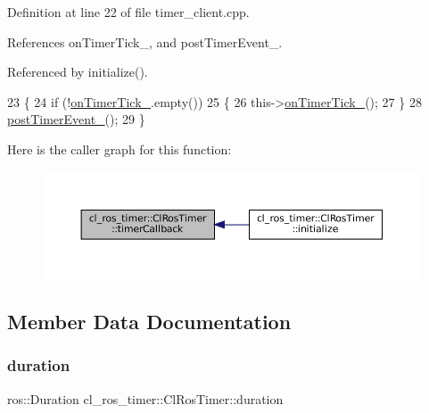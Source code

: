 Definition at line 22 of file timer\+\_\+client.\+cpp.



References on\+Timer\+Tick\+\_\+, and post\+Timer\+Event\+\_\+.



Referenced by initialize().


\begin{DoxyCode}
23 \{
24     \textcolor{keywordflow}{if} (!\hyperlink{classcl__ros__timer_1_1ClRosTimer_a2fcaab287b6ee13f6cc689876c6d28fa}{onTimerTick\_}.empty())
25     \{
26         this->\hyperlink{classcl__ros__timer_1_1ClRosTimer_a2fcaab287b6ee13f6cc689876c6d28fa}{onTimerTick\_}();
27     \}
28     \hyperlink{classcl__ros__timer_1_1ClRosTimer_af502ca54355f50d19d4aa6ca5f4e0c23}{postTimerEvent\_}();
29 \}
\end{DoxyCode}
Here is the caller graph for this function\+:
\nopagebreak
\begin{figure}[H]
\begin{center}
\leavevmode
\includegraphics[width=350pt]{classcl__ros__timer_1_1ClRosTimer_a047720c2f37e354e0867b148c85e18e3_icgraph}
\end{center}
\end{figure}


\subsection{Member Data Documentation}
\mbox{\label{classcl__ros__timer_1_1ClRosTimer_a39a5666044409eca94562fcceca8b0ea}} 
\subsubsection{\texorpdfstring{duration}{duration}}
{\footnotesize\ttfamily ros\+::\+Duration cl\+\_\+ros\+\_\+timer\+::\+Cl\+Ros\+Timer\+::duration\hspace{0.3cm}{\ttfamily [protected]}}



